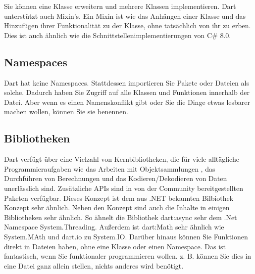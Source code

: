 \begin{minipage}{\linewidth}

\end{minipage}

Sie können eine Klasse erweitern und mehrere Klassen implementieren. Dart unterstützt auch Mixin's. Ein Mixin ist wie das Anhängen einer Klasse und das Hinzufügen ihrer Funktionalität zu der Klasse, ohne tatsächlich von ihr zu erben. Dies ist auch ähnlich wie die Schnittstellenimplementierungen von C\# 8.0.

\begin{minipage}{\linewidth}

\end{minipage}

\subsection{Namespaces}
Dart hat keine Namespaces. Stattdessen importieren Sie Pakete oder Dateien als solche.
Dadurch haben Sie Zugriff auf alle Klassen und Funktionen innerhalb der Datei. Aber wenn es einen Namenskonflikt gibt oder Sie die Dinge etwas lesbarer machen wollen, können Sie sie benennen.

\begin{minipage}{\linewidth}

\end{minipage}

\subsection{Bibliotheken}
Dart verfügt über eine Vielzahl von Kernbibliotheken, die für viele alltägliche Programmieraufgaben wie das Arbeiten mit Objektsammlungen , das Durchführen von Berechnungen und das Kodieren/Dekodieren von Daten  unerlässlich sind.  Zusätzliche APIs sind in von der Community bereitgestellten Paketen verfügbar. Dieses Konzept ist dem aus .NET bekannten Bilbiothek Konzept sehr ähnlich.
Neben den Konzept sind auch die Inhalte in einigen Bibliotheken sehr ähnlich. So ähnelt die Bibliothek dart:async sehr dem .Net Namespace System.Threading.  Außerdem ist dart:Math sehr ähnlich wie System.MAth und dart.io zu System.IO.
Darüber hinaus können Sie Funktionen direkt in Dateien haben, ohne eine Klasse oder einen Namespace. Das ist fantastisch, wenn Sie funktionaler programmieren wollen. z. B. können Sie dies in eine Datei ganz allein stellen, nichts anderes wird benötigt.

